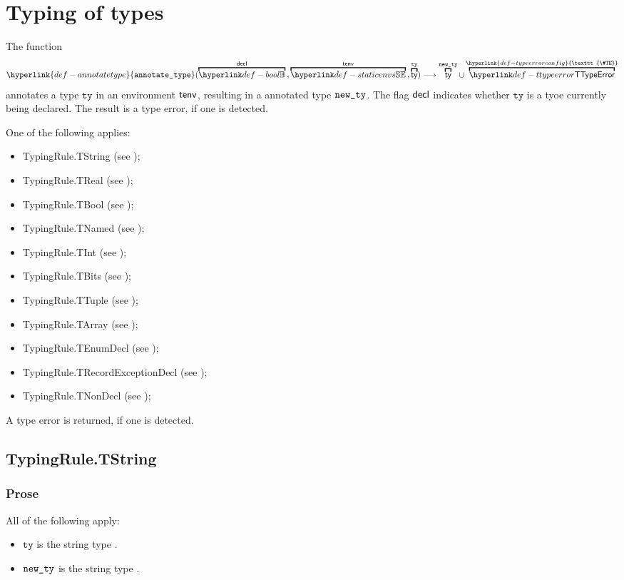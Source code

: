 \documentclass{book}
\newcommand\TypeErrorConfig[0]{\hyperlink{def-typeerrorconfig}{\texttt{\#TE}}}
\newcommand\annotatetype[1]{\hyperlink{def-annotatetype}{\texttt{annotate\_type}}(#1)}
\newcommand\tty[0]{\texttt{ty}}
\begin{document}
\chapter{Typing of types \label{chap:typingoftypes}}
\hypertarget{def-annotatetype}{}
The function
\[
  \annotatetype{\overname{\Bool}{\decl} \aslsep \overname{\staticenvs}{\tenv} \aslsep \overname{\ty}{\tty}}
  \aslto \overname{\ty}{\newty} \cup \overname{\TTypeError}{\TypeErrorConfig}
\]
annotates a type $\tty$ in an environment $\textsf{tenv}$, resulting in a
annotated type $\texttt{new\_ty}$.
The flag $\textsf{decl}$ indicates whether $\tty$ is a tyoe currently being declared.
The result is a type error, if one is detected.

One of the following applies:
\begin{itemize}
  \item TypingRule.TString (see );
  \item TypingRule.TReal (see );
  \item TypingRule.TBool (see );
  \item TypingRule.TNamed (see );
  \item TypingRule.TInt (see );
  \item TypingRule.TBits (see );
  \item TypingRule.TTuple (see );
  \item TypingRule.TArray (see );
  \item TypingRule.TEnumDecl (see );
  \item TypingRule.TRecordExceptionDecl (see
    );
  \item TypingRule.TNonDecl (see );
\end{itemize}
A type error is returned, if one is detected.

\section{TypingRule.TString \label{sec:TypingRule.TString}}

\subsection{Prose}
All of the following apply:
\begin{itemize}
  \item $\tty$ is the string type \TString.
  \item $\texttt{new\_ty}$ is the string type \TString.
\end{itemize}
\end{document}
